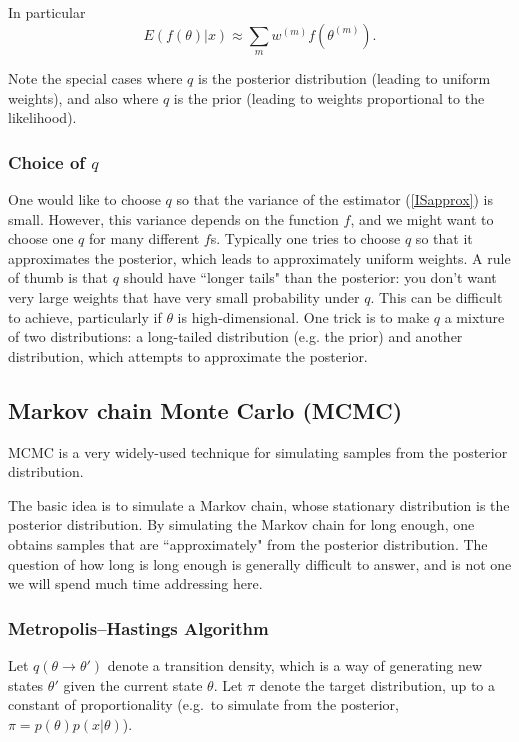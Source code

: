 \documentclass[12pt]{article}
\begin{document}
In particular 
\begin{equation} \label{ISapprox}
E(f(\theta) | x) \approx \sum_m w^{(m)} f(\theta^{(m)}).
\end{equation}

Note the special cases where $q$ is the posterior distribution (leading to 
uniform weights), and also where $q$ is the prior (leading to weights proportional
to the likelihood). 

\subsubsection{Choice of $q$}

One would like to choose $q$ so that 
the variance of the estimator (\ref{ISapprox}) is small. However, this variance depends
on the function $f$, and we might want to choose one $q$ for many different $f$s. 
Typically one tries to choose $q$ so that it approximates the posterior, which leads to
approximately uniform weights.  A rule of thumb is that $q$ should have ``longer tails"
than the posterior: you don't want very large weights that have very small probability under $q$.
This can be difficult to achieve, particularly if $\theta$ is high-dimensional. One
trick is to make $q$ a mixture of two distributions: a long-tailed distribution (e.g. the prior)
and another distribution, which attempts to approximate the posterior.

\subsection{Markov chain Monte Carlo (MCMC)}

MCMC is a very widely-used technique for simulating samples from the posterior
distribution.

The basic idea is to simulate a Markov chain, whose stationary distribution is the posterior distribution.
By simulating the Markov chain for long enough, one obtains samples that
are ``approximately" from the posterior distribution. The question of how long is long enough is
generally difficult to answer, and is not one we will spend much time addressing here. 

\subsubsection{Metropolis--Hastings Algorithm}

Let $q(\theta \rightarrow \theta')$ denote a transition density, which is a way of generating new states $\theta'$
given the current state $\theta$. Let $\pi$ denote the target distribution, 
up to a constant of proportionality (e.g.~to simulate from the posterior, 
$\pi = p(\theta) p(x | \theta)$).
\end{document}
